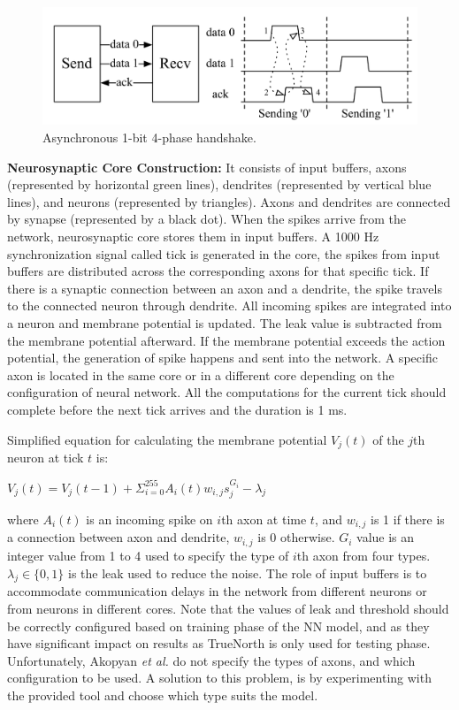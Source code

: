 \documentclass[11pt,twoside]{article}
\begin{document}
\begin{figure}
	\centering
	\includegraphics[width=0.4\linewidth]{Report-LateX-Template/fig/onebit.PNG}
	\caption{Asynchronous 1-bit 4-phase handshake.}
	\label{fig:onebit}
\end{figure}

\textbf{Neurosynaptic Core Construction:} It consists of input buffers, axons (represented by horizontal green lines), dendrites (represented by vertical blue lines), and neurons (represented by triangles). Axons and dendrites are connected by synapse (represented by a black dot). When the spikes arrive from the network, neurosynaptic core stores them in input buffers. A 1000 Hz synchronization signal called tick is generated in the core, the spikes from input buffers are distributed across the corresponding axons for that specific tick. If there is a synaptic connection between an axon and a dendrite, the spike travels to the connected neuron through dendrite. All incoming spikes are integrated into a neuron and membrane potential is updated. The leak value is subtracted from the membrane potential afterward. If the membrane potential exceeds the action potential, the generation of spike happens and sent into the network. A specific axon is located in the same core or in a different core depending on the configuration of neural network. All the computations for the current tick should complete before the next tick arrives and the duration is 1 ms.
\par
Simplified equation for calculating the membrane potential $V_j(t)$ of the $j$th neuron at tick $t$ is:
\centerline{$V_j(t) = V_j(t-1) + \Sigma_{i=0}^{255}A_i(t)w_{i,j}s_{j}^{G_i}-\lambda_j$}
\newline where $A_i(t)$ is an incoming spike on $i$th axon at time $t$, and $w_{i,j}$ is 1 if there is a connection between axon and dendrite, $w_{i,j}$ is 0 otherwise. $G_i$ value is an integer value from 1 to 4 used to specify the type of $i$th axon from four types. $\lambda_j \in \{ 0,1 \}$ is the leak used to reduce the noise. The role of input buffers is to accommodate communication delays in the network from different neurons or from neurons in different cores. Note that the values of leak and threshold should be correctly configured based on training phase of the NN model, and as they have significant impact on results as TrueNorth is only used for testing phase. Unfortunately, Akopyan \textit{et al.} \cite{akopyan2015truenorth} do not specify the types of axons, and which configuration to be used. A solution to this problem, is by experimenting with the provided tool and choose which type suits the model.
\end{document}
